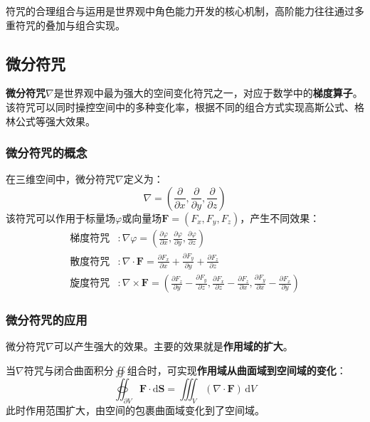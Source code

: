 \documentclass[lang=cn,newtx,10pt,scheme=chinese]{elegantbook}
\newcommand{\md}{\mathrm{d}}
\begin{document}
符咒的合理组合与运用是世界观中角色能力开发的核心机制，高阶能力往往通过多重符咒的叠加与组合实现。

\subsection{微分符咒}

\textbf{微分符咒$\nabla$}是世界观中最为强大的空间变化符咒之一，对应于数学中的\textbf{梯度算子}。该符咒可以同时操控空间中的多种变化率，根据不同的组合方式实现高斯公式、格林公式等强大效果。

\subsubsection{微分符咒的概念}

\begin{definition}[微分符咒]
    在三维空间中，微分符咒$\nabla$定义为：
    \[
        \nabla = \left(\frac{\partial}{\partial x}, \frac{\partial}{\partial y}, \frac{\partial}{\partial z}\right)
    \]
    该符咒可以作用于标量场$\varphi$或向量场$\bm{F}=(F_x,F_y,F_z)$，产生不同效果：
    \begin{align*}
        \text{梯度符咒} & : \nabla\varphi = \left(\frac{\partial\varphi}{\partial x}, \frac{\partial\varphi}{\partial y}, \frac{\partial\varphi}{\partial z}\right)                                                                                                   \\
        \text{散度符咒} & : \nabla\cdot\bm{F} = \frac{\partial F_x}{\partial x} + \frac{\partial F_y}{\partial y} + \frac{\partial F_z}{\partial z}                                                                                                                   \\
        \text{旋度符咒} & : \nabla\times\bm{F} = \left(\frac{\partial F_z}{\partial y} - \frac{\partial F_y}{\partial z}, \frac{\partial F_x}{\partial z} - \frac{\partial F_z}{\partial x}, \frac{\partial F_y}{\partial x} - \frac{\partial F_x}{\partial y}\right)
    \end{align*}
\end{definition}

\subsubsection{微分符咒的应用}
微分符咒$\nabla$可以产生强大的效果。主要的效果就是\textbf{作用域的扩大}。

\begin{theorem}[高斯符咒公式]
    当$\nabla$符咒与闭合曲面积分$\oiint$组合时，可实现\textbf{作用域从曲面域到空间域的变化}：
    \[
        \oiint_{\partial V} \bm{F}\cdot\mathrm{d}\bm{S}=\iiint_V (\nabla\cdot\bm{F}) \,\md V
    \]
    此时作用范围扩大，由空间的包裹曲面域变化到了空间域。
\end{theorem}
\end{document}
